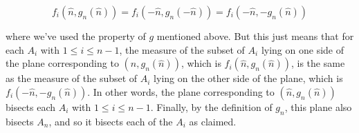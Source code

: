 \documentclass[12pt]{article}
\begin{document}
\[ f_i(\hat n,g_n(\hat n))=f_i(-\hat n,g_n(-\hat n))=f_i(-\hat n,-g_n(\hat n)) \]

where we've used the property of $g$ mentioned above.  But this just means that for each $A_i$ with $1 \leq i \leq n-1$, the measure of the subset of $A_i$ lying on one side of the plane corresponding to $(\hat n,g_n(\hat n))$, which is $f_i(\hat n,g_n(\hat n))$, is the same as the measure of the subset of $A_i$ lying on the other side of the plane, which is $f_i(-\hat n,-g_n(\hat n))$.  In other words, the plane corresponding to $(\hat n,g_n(\hat n))$ bisects each $A_i$ with $1 \leq i \leq n-1$.  Finally, by the definition of $g_n$, this plane also bisects $A_n$, and so it bisects each of the $A_i$ as claimed.
\end{document}
